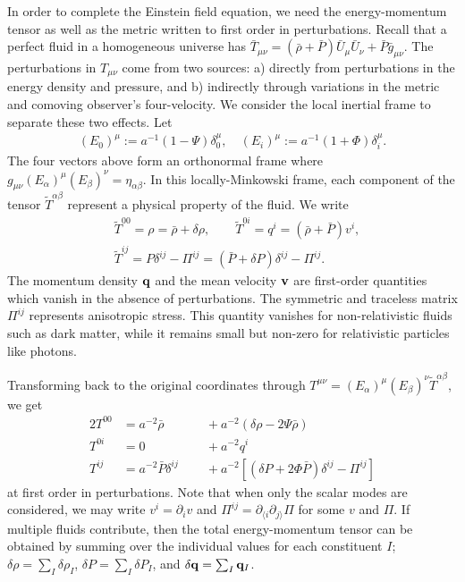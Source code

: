 In order to complete the Einstein field equation, we need the energy-momentum tensor as well as the metric written to first order in perturbations. Recall that a perfect fluid in a homogeneous universe has $\bar{T}_{\mu\nu} = (\bar{\rho} + \bar{P}) \bar{U}_\mu \bar{U}_\nu + \bar{P} \bar{g}_{\mu\nu}$. The perturbations in $T_{\mu\nu}$ come from two sources: a) directly from perturbations in the energy density and pressure, and b) indirectly through variations in the metric and comoving observer's four-velocity. We consider the local inertial frame to separate these two effects. Let
\begin{align}
	(E_0)^\mu := a^{-1} (1 - \Psi) \delta^\mu_0, \quad (E_i)^\mu := a^{-1} (1 + \Phi) \delta^\mu_i. \label{eqn:newtonian_gauge_tetrad}
\end{align}
The four vectors above form an orthonormal frame where $g_{\mu\nu}(E_\alpha)^\mu (E_\beta)^\nu = \eta_{\alpha\beta}$. In this locally-Minkowski frame, each component of the tensor $\tilde{T}^{\alpha\beta}$ represent a physical property of the fluid. We write
\begin{align}
	&\tilde{T}^{00} = \rho = \bar{\rho} + \delta\rho, \qquad \tilde{T}^{0i} = q^i = (\bar{\rho}+\bar{P})v^i, \\
	&\tilde{T}^{ij} = P \delta^{ij} - \Pi^{ij} = (\bar{P} + \delta P) \delta^{ij} - \Pi^{ij}.
\end{align}
The momentum density $\mathbf{q}$ and the mean velocity $\mathbf{v}$ are first-order quantities which vanish in the absence of perturbations. The symmetric and traceless matrix $\Pi^{ij}$ represents anisotropic stress. This quantity vanishes for non-relativistic fluids such as dark matter, while it remains small but non-zero for relativistic particles like photons.

Transforming back to the original coordinates through $T^{\mu\nu}=(E_\alpha)^\mu (E_\beta)^\nu \tilde{T}^{\alpha\beta}$, we get
\begin{alignat}{2}
	T^{00} &= a^{-2} \bar{\rho} &&\;\;+ a^{-2}\left( \delta\rho - 2\Psi\bar{\rho} \right) \label{eqn:perturbed_energy_momentum_tensor_1}\\
	T^{0i} &= 0 &&\;\;+ a^{-2} q^i \label{eqn:perturbed_energy_momentum_tensor_2}\\
	T^{ij} &= a^{-2} \bar{P} \delta^{ij} &&\;\;+ a^{-2} \left[ (\delta P + 2\Phi\bar{P})\delta^{ij} - \Pi^{ij} \right]\label{eqn:perturbed_energy_momentum_tensor_3}
\end{alignat}
at first order in perturbations. Note that when only the scalar modes are considered, we may write $v^i = \partial_i v$ and $\Pi^{ij} = \partial_{\langle i} \partial_{j \rangle} \Pi$ for some $v$ and $\Pi$. If multiple fluids contribute, then the total energy-momentum tensor can be obtained by summing over the individual values for each constituent $I$; $\delta\rho = \sum_I \delta\rho_I$, $\delta P = \sum_I \delta P_I$, and $\delta \mathbf{q} = \sum_I \mathbf{q}_I$.

